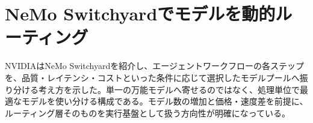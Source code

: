 \section{NeMo Switchyardでモデルを動的ルーティング}
NVIDIAはNeMo Switchyardを紹介し、エージェントワークフローの各ステップを、品質・レイテンシ・コストといった条件に応じて選択したモデルプールへ振り分ける考え方を示した。単一の万能モデルへ寄せるのではなく、処理単位で最適なモデルを使い分ける構成である。モデル数の増加と価格・速度差を前提に、ルーティング層そのものを実行基盤として扱う方向性が明確になっている。
